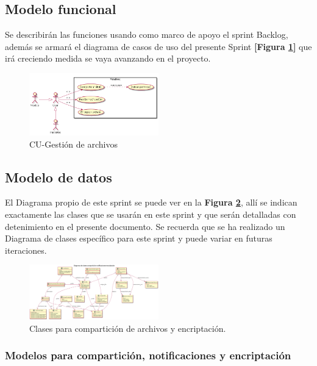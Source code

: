 \subsection{Modelo funcional} 
Se describirán las funciones usando como marco de apoyo el sprint Backlog, además se armará el diagrama de casos de uso del presente Sprint \textbf{[Figura \ref{8-cu_compartición_encriptación}]} que irá creciendo  medida se vaya avanzando en el proyecto.

    \begin{figure}[h]
        \centering
        \includegraphics[width=0.5\textwidth]{img/dcu_sprint8}
        \caption{CU-Gestión de archivos}
		\label{8-cu_compartición_encriptación}
    \end{figure}


\subsection{Modelo de datos}
El Diagrama propio de este sprint se puede ver en la \textbf{Figura \ref{8-clases_compartición_encriptación}}, allí se indican exactamente las clases que se usarán en este sprint y que serán detalladas con detenimiento en el presente documento. Se recuerda que se ha realizado un Diagrama de clases específico para este sprint y puede variar en futuras iteraciones.

    \begin{figure}[h]
        \centering
        \includegraphics[width=0.5\textwidth]{img/dc_sprint8}
        \caption{Clases para compartición de archivos y encriptación.}
		\label{8-clases_compartición_encriptación}
    \end{figure}

\subsubsection{Modelos para compartición, notificaciones y encriptación}

